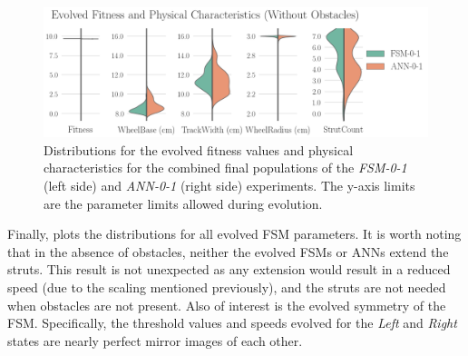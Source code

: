 \begin{figure}[!ht]
    \centering

    \includegraphics[width=\columnwidth]{figures/4-results/0-1-best_params.png}


    \caption{Distributions for the evolved fitness values and physical characteristics for the combined final populations of the \emph{FSM-0-1} (left side) and \emph{ANN-0-1} (right side) experiments. The y-axis limits are the parameter limits allowed during evolution.}
    \label{fig:0-1-best-params}


\end{figure}


Finally,  plots the distributions for all evolved FSM parameters.
%
It is worth noting that in the absence of obstacles, neither the evolved FSMs or ANNs extend the struts.
%
This result is not unexpected as any extension would result in a reduced speed (due to the scaling mentioned previously), and the struts are not needed when obstacles are not present.
%
Also of interest is the evolved symmetry of the FSM.
%
Specifically, the threshold values and speeds evolved for the \emph{Left} and \emph{Right} states are nearly perfect mirror images of each other.


